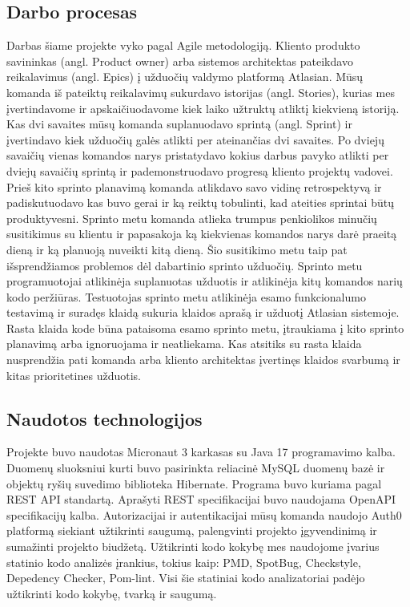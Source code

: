 \documentclass{VUMIFPSkursinis}
\begin{document}
	\subsection{Darbo procesas}
		Darbas šiame projekte vyko pagal Agile metodologiją.
		Kliento produkto savininkas (angl. Product owner) arba sistemos architektas pateikdavo reikalavimus (angl. Epics) 
		į užduočių valdymo platformą Atlasian. Mūsų komanda iš pateiktų reikalavimų sukurdavo istorijas (angl. Stories),
		kurias mes įvertindavome ir apskaičiuodavome kiek laiko užtruktų atliktį kiekvieną istoriją.
		Kas dvi savaites mūsų komanda suplanuodavo sprintą (angl. Sprint) ir įvertindavo kiek užduočių galės atlikti per ateinančias dvi savaites.
		Po dviejų savaičių vienas komandos narys pristatydavo kokius darbus pavyko atlikti per dviejų savaičių sprintą ir pademonstruodavo progresą kliento projektų vadovei.
		Prieš kito sprinto planavimą komanda atlikdavo savo vidinę retrospektyvą ir padiskutuodavo kas buvo gerai ir ką reiktų tobulinti, kad ateities sprintai būtų produktyvesni.
		Sprinto metu komanda atlieka trumpus penkiolikos minučių susitikimus su klientu ir papasakoja ką kiekvienas komandos
		narys darė praeitą dieną ir ką planuoją nuveikti kitą dieną.
		Šio susitikimo metu taip pat išsprendžiamos problemos dėl dabartinio sprinto užduočių.
		Sprinto metu programuotojai atlikinėja suplanuotas užduotis ir atlikinėja kitų komandos narių kodo peržiūras.
		Testuotojas sprinto metu atlikinėja esamo funkcionalumo testavimą ir suradęs klaidą sukuria klaidos aprašą ir užduotį Atlasian sistemoje.
		Rasta klaida kode būna pataisoma esamo sprinto metu, įtraukiama į kito sprinto planavimą arba ignoruojama ir 
		neatliekama.
		Kas atsitiks su rasta klaida nusprendžia pati komanda arba kliento architektas įvertinęs klaidos svarbumą ir kitas prioritetines užduotis.
		
	\subsection{Naudotos technologijos}
		Projekte buvo naudotas Micronaut 3 karkasas su Java 17 programavimo kalba.
		Duomenų sluoksniui kurti buvo pasirinkta reliacinė MySQL duomenų bazė ir objektų ryšių suvedimo biblioteka Hibernate.
		Programa buvo kuriama pagal REST API standartą. Aprašyti REST specifikacijai buvo naudojama OpenAPI specifikacijų kalba.
		Autorizacijai ir autentikacijai mūsų komanda naudojo Auth0 platformą siekiant užtikrinti saugumą, palengvinti projekto įgyvendinimą ir sumažinti projekto 
		biudžetą.
		Užtikrinti kodo kokybę mes naudojome įvarius statinio kodo analizės įrankius, tokius kaip: PMD, SpotBug, Checkstyle, Depedency Checker, Pom-lint.
		Visi šie statiniai kodo analizatoriai padėjo užtikrinti kodo kokybę, tvarką ir saugumą.
		
\end{document}
